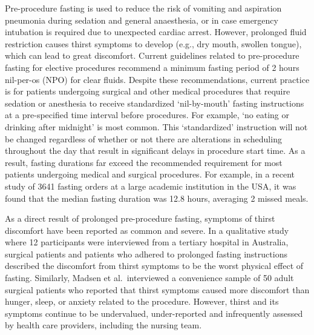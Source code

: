 \documentclass[letterpaper,9pt,twocolumn,twoside,]{pinp}
\begin{document}
Pre-procedure fasting is used to reduce the risk of vomiting and
aspiration pneumonia during sedation and general anaesthesia, or in case
emergency intubation is required due to unexpected cardiac
arrest.\citep{hamid2014pre, osborne2002preoperative} However, prolonged
fluid restriction causes thirst symptoms to develop (e.g., dry mouth,
swollen tongue), which can lead to great
discomfort.\citep{madsen1998perioperative} Current guidelines related to
pre-procedure fasting for elective procedures recommend a minimum
fasting period of 2 hours nil-per-os (NPO) for clear
fluids.\citep{dobsonGuidelinesPracticeAnesthesia2018} Despite these
recommendations, current practice is for patients undergoing surgical
and other medical procedures that require sedation or anesthesia to
receive standardized `nil-by-mouth' fasting instructions at a
pre-specified time interval before procedures. For example, `no eating
or drinking after midnight' is most common. This `standardized'
instruction will not be changed regardless of whether or not there are
alterations in scheduling throughout the day that result in significant
delays in procedure start time. As a result, fasting durations far
exceed the recommended requirement for most patients undergoing medical
and surgical
procedures.\citep{de2014actual, sorita2015frequency, spitz2017impact}
For example, in a recent study of 3641 fasting orders at a large
academic institution in the USA, it was found that the median fasting
duration was 12.8 hours, averaging 2 missed
meals.\citep{sorita2015frequency}

As a direct result of prolonged pre-procedure fasting, symptoms of
thirst discomfort have been reported as common and severe. In a
qualitative study where 12 participants were interviewed from a tertiary
hospital in Australia, surgical patients and patients who adhered to
prolonged fasting instructions described the discomfort from thirst
symptoms to be the worst physical effect of
fasting.\citep{carey2015qualitative} Similarly, Madsen et
al.~interviewed a convenience sample of 50 adult surgical patients who
reported that thirst symptoms caused more discomfort than hunger, sleep,
or anxiety related to the procedure.\citep{madsen1998perioperative}
However, thirst and its symptoms continue to be undervalued,
under-reported and infrequently assessed by health care providers,
including the nursing team.\citep{milani2016thirst}
\end{document}
